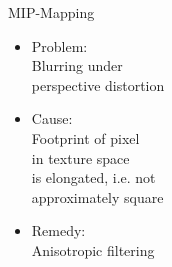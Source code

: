 \documentclass[utf8,stillsansserifmath,fleqn,t]{beamer}
\begin{document}
\begin{frame}
MIP-Mapping
\begin{itemize}
\item Problem:\\
Blurring under\\ perspective distortion
\item<2> Cause:\\
    Footprint of pixel\\ in texture space\\ is elongated,
    i.e. not\\ approximately square
\item<2> Remedy:\\
    Anisotropic filtering
\end{itemize}
\end{frame}

\begin{frame}[label=texture-mipmap-anisotropic]
\frametitle{\insertsection}

\end{frame}
\end{document}
